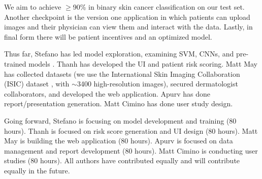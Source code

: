 \documentclass[a4paper,12pt]{article}
\begin{document}
We aim to achieve $\geq$90\% in binary skin cancer classification on our test
set. Another checkpoint is the version one application in which patients can
upload images and their physician can view them and interact with the data.
Lastly, in final form there will be patient incentives and an optimized model.

Thus far, Stefano has led model exploration, examining SVM, CNNs, and
pre-trained models \cite{razavian2014cnn}. Thanh has developed the UI and
patient risk scoring. Matt May has collected datasets (we use the
International Skin Imaging Collaboration (ISIC) dataset \cite{isicarchive},
with $\sim$3400 high-resolution images), secured dermatologist collaborators,
and developed the web application. Apurv has done report/presentation
generation. Matt Cimino has done user study design.

Going forward, Stefano is focusing on model development and
training (80 hours). Thanh is focused on risk score generation and UI design
(80 hours). Matt May is building the web application (80 hours).
Apurv is focused on data management and report development (80 hours). Matt
Cimino is conducting user studies (80 hours). All authors have contributed
equally and will contribute equally in the future.


\end{document}
